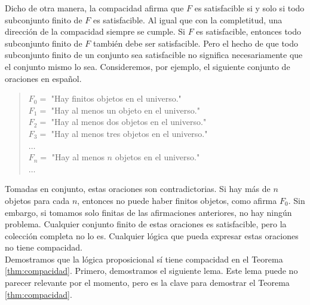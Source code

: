 \message{ !name(main.tex)}\documentclass[12pt,a4paper]{book}
\newcommand{\comillas}[1]{"#1"}
\begin{document}
    Dicho de otra manera, la compacidad afirma que $F$ es satisfacible si y solo si todo subconjunto finito de $F$ es
    satisfacible. Al igual que con la completitud, una dirección de la compacidad siempre se cumple. Si $F$ es satisfacible,
    entonces todo subconjunto finito de $F$ también debe ser satisfacible. Pero el hecho de que todo subconjunto finito de
    un conjunto sea satisfacible no significa necesariamente que el conjunto mismo lo sea. Consideremos, por ejemplo, el
    siguiente conjunto de oraciones en español.

    \begin{quote}
        $F_{0}=$ \comillas{Hay finitos objetos en el universo.}\\
        $F_{1}=$ \comillas{Hay al menos un objeto en el universo.}\\
        $F_{2}=$ \comillas{Hay al menos dos objetos en el universo.}\\
        $F_{3}=$ \comillas{Hay al menos tres objetos en el universo.}\\
        $\dots$\\
        $F_{n}=$ \comillas{Hay al menos $n$ objetos en el universo.}\\
        $\dots$
    \end{quote}

    Tomadas en conjunto, estas oraciones son contradictorias. Si hay más de $n$ objetos para cada $n$, entonces no puede
    haber finitos objetos, como afirma $F_{0}$. Sin embargo, si tomamos solo finitas de las afirmaciones anteriores, no hay
    ningún problema. Cualquier conjunto finito de estas oraciones es satisfacible, pero la colección completa no lo es.
    Cualquier lógica que pueda expresar estas oraciones no tiene compacidad.\\
    Demostramos que la lógica proposicional sí tiene compacidad en el Teorema \ref{thm:compacidad}. Primero, demostramos el
    siguiente lema. Este lema puede no parecer relevante por el momento, pero es la clave para demostrar el Teorema
    \ref{thm:compacidad}.
\end{document}

